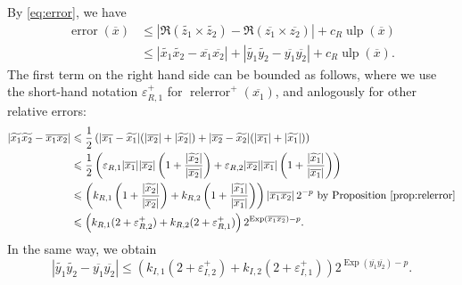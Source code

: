 \documentclass {article}
\newcommand {\corr}[1]{\widetilde {#1}}
\newcommand {\appro}[1]{\overline {#1}}
\newcommand {\Ulp}{{\operatorname {ulp}}}
\DeclareMathOperator{\Exp}{\operatorname {Exp}}
\newcommand{\error}{\operatorname {error}}
\newcommand{\relerror}{\operatorname {relerror}}
\renewcommand {\epsilon}{\varepsilon}
\renewcommand {\leq}{\leqslant}
\begin{document}
By \eqref {eq:error}, we have
\begin {align*}
\error (\appro x)
& \leq | \Re (\corr {z_1} \times \corr {z_2})
- \Re (\appro {z_1} \times \appro {z_2})|
+ c_R \Ulp (\appro x) \\
& \leq
| \corr {x_1} \corr {x_2} - \appro {x_1} \appro {x_2}|
+ | \corr {y_1} \corr {y_2} - \appro {y_1} \appro {y_2}|
+ c_R \Ulp (\appro x).
\end {align*}
The first term on the right hand side can be bounded as follows,
where we use the short-hand notation $\epsilon_{R, 1}^+$ for
$\relerror^+ (\appro {x_1})$, and anlogously for other relative errors:
\begin{align*}
| \corr {x_1} \corr {x_2} - \appro {x_1} \appro {x_2}|
& \leq
\frac{1}{2} \left(
  |\appro {x_1} - \corr {x_1}| (|\appro {x_2}| + |\corr {x_2}|)
+ |\appro {x_2} - \corr {x_2}| (|\appro {x_1}| + |\corr {x_1}|)
\right)
\\
& \leq \frac {1}{2} \left(
  \epsilon_{R, 1} |\appro {x_1}| |\appro {x_2}|
  \left( 1 + \frac {|\corr {x_2}|}{|\appro {x_2}|} \right)
+ \epsilon_{R, 2} |\appro {x_2}| |\appro {x_1}|
  \left( 1 + \frac {|\corr {x_1}|}{|\appro {x_1}|} \right)
  \right)
\\
& \leq \left(
  k_{R, 1}
  \left( 1 + \frac {|\corr {x_2}|}{|\appro {x_2}|} \right)
+ k_{R, 2}
  \left( 1 + \frac {|\corr {x_1}|}{|\appro {x_1}|} \right)
  \right) |\appro {x_1} \appro {x_2}| \, 2^{-p}
  \text { by Proposition~\ref {prop:relerror}}
\\
& \leq \left(
   k_{R, 1} (2 + \epsilon_{R, 2}^+)
   + k_{R, 2} (2 + \epsilon_{R, 1}^+)
   \right) 2^{\Exp (\appro {x_1} \appro {x_2}) - p}.
\end{align*}
In the same way, we obtain
\[
| \corr {y_1} \corr {y_2} - \appro {y_1} \appro {y_2}|
\leq \left(
   k_{I, 1} (2 + \epsilon_{I, 2}^+)
   + k_{I, 2} (2 + \epsilon_{I, 1}^+)
   \right) 2^{\Exp (\appro {y_1} \appro {y_2}) - p}.
\]
\end{document}
